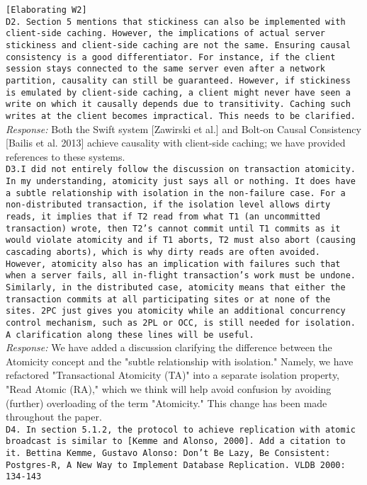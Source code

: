 \documentclass[10pt]{article}
\newcommand{\reviewer}[1] {\noindent\texttt{#1}\\}
\newcommand{\response}[1] {\noindent\textit{Response: } #1\\}
\begin{document}
\reviewer{[Elaborating W2]\\
D2. Section 5 mentions that stickiness can also be implemented with client-side caching. However, the implications of actual server stickiness and client-side caching are not the same. Ensuring causal consistency is a good differentiator. For instance, if the client session stays connected to the same server even after a network partition, causality can still be guaranteed. However, if stickiness is emulated by client-side caching, a client might never have seen a write on which it causally depends due to transitivity. Caching such writes at the client becomes impractical. This needs to be clarified.}

\response{Both the Swift system [Zawirski et al.] and Bolt-on Causal Consistency
[Bailis et al. 2013] achieve causality with client-side caching; we
have provided references to these systems.}

\reviewer{D3.I did not entirely follow the discussion on transaction atomicity. In my understanding, atomicity just says all or nothing. It does have a subtle relationship with isolation in the non-failure case. For a non-distributed transaction, if the isolation level allows dirty reads, it implies that if T2 read from what T1 (an uncommitted transaction) wrote, then T2's cannot commit until T1 commits as it would violate atomicity and if T1 aborts, T2 must also abort (causing cascading aborts), which is why dirty reads are often avoided. However, atomicity also has an implication with failures such that when a server fails, all in-flight transaction's work must be undone. Similarly, in the distributed case, atomicity means that either the transaction commits at all participating sites or at none of the sites. 2PC just gives you atomicity while an additional concurrency control mechanism, such as 2PL or OCC, is still needed for isolation. A clarification along these lines will be useful.}

\response{We have added a discussion clarifying the difference between the
Atomicity concept and the "subtle relationship with isolation."
Namely, we have refactored "Transactional Atomicity (TA)" into a
separate isolation property, "Read Atomic (RA)," which we think will
help avoid confusion by avoiding (further) overloading of the term
"Atomicity." This change has been made throughout the paper.}

\reviewer{D4. In section 5.1.2, the protocol to achieve replication with atomic broadcast is similar to [Kemme and Alonso, 2000]. Add a citation to it. Bettina Kemme, Gustavo Alonso: Don't Be Lazy, Be Consistent: Postgres-R, A New Way to Implement Database Replication. VLDB 2000: 134-143}
\end{document}
